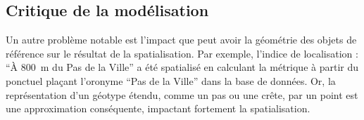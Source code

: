\subsection{Critique de la modélisation}
\label{subsec:9-2-3}


Un autre problème notable est l'impact que peut avoir la géométrie des
objets de référence sur le résultat de la spatialisation. Par exemple,
l'indice de localisation : \enquote{À \SI{800}{\meter} du Pas de la
  Ville} a été spatialisé en calculant la métrique
 à partir du ponctuel plaçant l'oronyme
\enquote{Pas de la Ville} dans la base de données. Or, la
représentation d'un géotype étendu, comme un pas ou une crête, par un
point est une approximation conséquente, impactant fortement la
spatialisation.


